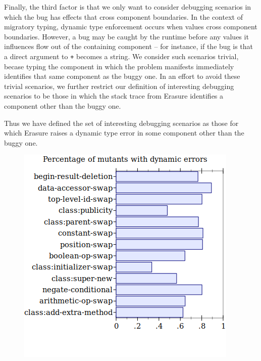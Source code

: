 Finally, the third factor is that we only want to consider debugging scenarios in which the bug has effects that cross component boundaries.
In the context of migratory typing, dynamic type enforcement occurs when values cross component boundaries.
However, a bug may be caught by the runtime before any values it influences flow out of the containing component -- for instance, if the bug is that a direct argument to \texttt{+} becomes a string.
We consider such scenarios trivial, becase typing the component in which the problem manifests immediately identifies that same component as the buggy one.
In an effort to avoid these trivial scenarios, we further restrict our definition of interesting debugging scenarios to be those in which the stack trace from Erasure identifies a component other than the buggy one.

Thus we have defined the set of interesting debugging scenarios as those for which Erasure raises a dynamic type error in some component other than the buggy one.

\begin{figure}
  \centering
  \includegraphics[width=\textwidth]{./plots/code-dynamic-error}
  \caption{}
  \label{fig:mutators-runtime-hit}
\end{figure}

